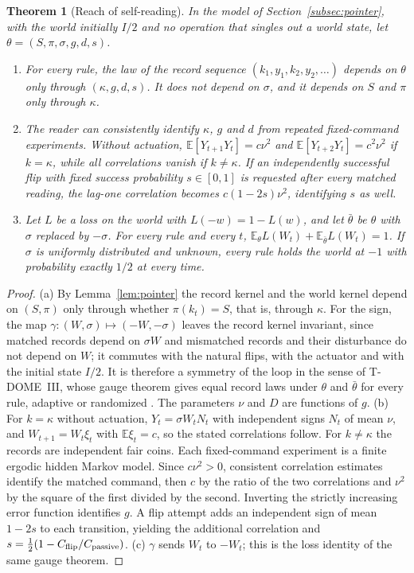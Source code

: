 \documentclass[11pt,a4paper]{article}
\newtheorem{theorem}[definition]{Theorem}
\newcommand{\E}{\mathbb E}
\begin{document}
\begin{theorem}[Reach of self-reading]\label{thm:reach}
In the model of Section~\ref{subsec:pointer}, with the world initially $I/2$ and no operation that singles out a world state, let $\theta=(S,\pi,\sigma,g,d,s)$.
\begin{enumerate}
\item[(a)] For every rule, the law of the record sequence $(k_1,y_1,k_2,y_2,\dots)$ depends on $\theta$ only through $(\kappa,g,d,s)$. It does not depend on $\sigma$, and it depends on $S$ and $\pi$ only through $\kappa$.
\item[(b)] The reader can consistently identify $\kappa$, $g$ and $d$ from repeated fixed-command experiments. Without actuation, $\E[Y_{t+1}Y_t]=c\nu^2$ and $\E[Y_{t+2}Y_t]=c^2\nu^2$ if $k=\kappa$, while all correlations vanish if $k\ne\kappa$. If an independently successful flip with fixed success probability $s\in[0,1]$ is requested after every matched reading, the lag-one correlation becomes $c(1-2s)\nu^2$, identifying $s$ as well.
\item[(c)] Let $L$ be a loss on the world with $L(-w)=1-L(w)$, and let $\bar\theta$ be $\theta$ with $\sigma$ replaced by $-\sigma$. For every rule and every $t$, $\E_\theta L(W_t)+\E_{\bar\theta}L(W_t)=1$. If $\sigma$ is uniformly distributed and unknown, every rule holds the world at $-1$ with probability exactly $1/2$ at every time.
\end{enumerate}
\end{theorem}
\begin{proof}
(a) By Lemma~\ref{lem:pointer} the record kernel and the world kernel depend on $(S,\pi)$ only through whether $\pi(k_t)=S$, that is, through $\kappa$. For the sign, the map $\gamma:(W,\sigma)\mapsto(-W,-\sigma)$ leaves the record kernel invariant, since matched records depend on $\sigma W$ and mismatched records and their disturbance do not depend on $W$; it commutes with the natural flips, with the actuator and with the initial state $I/2$. It is therefore a symmetry of the loop in the sense of T-DOME~III, whose gauge theorem gives equal record laws under $\theta$ and $\bar\theta$ for every rule, adaptive or randomized \cite{TDIII}. The parameters $\nu$ and $D$ are functions of $g$.
(b) For $k=\kappa$ without actuation, $Y_t=\sigma W_tN_t$ with independent signs $N_t$ of mean $\nu$, and $W_{t+1}=W_t\xi_t$ with $\E\xi_t=c$, so the stated correlations follow. For $k\ne\kappa$ the records are independent fair coins. Each fixed-command experiment is a finite ergodic hidden Markov model. Since $c\nu^2>0$, consistent correlation estimates identify the matched command, then $c$ by the ratio of the two correlations and $\nu^2$ by the square of the first divided by the second. Inverting the strictly increasing error function identifies $g$. A flip attempt adds an independent sign of mean $1-2s$ to each transition, yielding the additional correlation and $s=\frac12(1-C_{\rm flip}/C_{\rm passive})$.
(c) $\gamma$ sends $W_t$ to $-W_t$; this is the loss identity of the same gauge theorem.
\end{proof}
\end{document}
